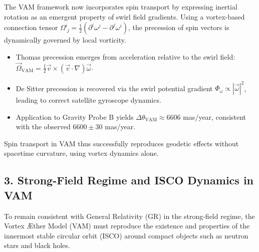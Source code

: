 \documentclass[a4paper, aps,preprint,superscriptaddress, 12pt]{revtex4}
\begin{document}
The VAM framework now incorporates spin transport by expressing inertial rotation as an emergent property of swirl field gradients. Using a vortex-based connection tensor \( \Omega^i_{\;j} = \frac{1}{2} (\partial^i \omega^j - \partial^j \omega^i) \), the precession of spin vectors is dynamically governed by local vorticity.

\begin{itemize}
    \item Thomas precession emerges from acceleration relative to the swirl field: \( \vec{\Omega}_\text{VAM} = \frac{1}{2} \vec{v} \times (\vec{v} \cdot \nabla) \vec{\omega} \).
    \item De Sitter precession is recovered via the swirl potential gradient \( \Phi_\omega \propto |\vec{\omega}|^2 \), leading to correct satellite gyroscope dynamics.
    \item Application to Gravity Probe B yields \( \Delta\theta_\text{VAM} \approx 6606 \) mas/year, consistent with the observed \( 6600 \pm 30 \) mas/year.
\end{itemize}

Spin transport in VAM thus successfully reproduces geodetic effects without spacetime curvature, using vortex dynamics alone.


\subsection*{3. Strong-Field Regime and ISCO Dynamics in VAM}

To remain consistent with General Relativity (GR) in the strong-field regime, the Vortex Æther Model (VAM) must reproduce the existence and properties of the innermost stable circular orbit (ISCO) around compact objects such as neutron stars and black holes.
\end{document}
